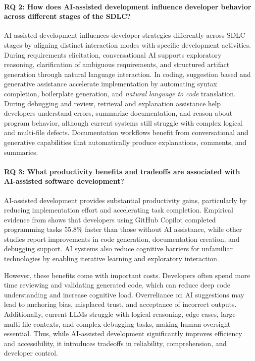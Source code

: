\paragraph{RQ 2: How does AI-assisted development influence developer behavior across different stages of the SDLC?}
AI-assisted development influences developer strategies differently across SDLC stages by aligning distinct interaction modes with specific development activities. During requirements elicitation, conversational AI supports exploratory reasoning, clarification of ambiguous requirements, and structured artifact generation through natural language interaction. In coding, suggestion based and generative assistance accelerate implementation by automating syntax completion, boilerplate generation, and \textit{natural language to code} translation. During debugging and review, retrieval and explanation assistance help developers understand errors, summarize documentation, and reason about program behavior, although current systems still struggle with complex logical and multi-file defects. Documentation workflows benefit from conversational and generative capabilities that automatically produce explanations, comments, and summaries.


\paragraph{RQ 3: What productivity benefits and tradeoffs are associated with AI-assisted software development?}
AI-assisted development provides substantial productivity gains, particularly by reducing implementation effort and accelerating task completion. Empirical evidence from \citet{peng2023copilot} shows that developers using GitHub Copilot completed programming tasks 55.8\% faster than those without AI assistance, while other studies report improvements in code generation, documentation creation, and debugging support. AI systems also reduce cognitive barriers for unfamiliar technologies by enabling iterative learning and exploratory interaction.

However, these benefits come with important costs. Developers often spend more time reviewing and validating generated code, which can reduce deep code understanding and increase cognitive load. Overreliance on AI suggestions may lead to anchoring bias, misplaced trust, and acceptance of incorrect outputs. Additionally, current LLMs struggle with logical reasoning, edge cases, large multi-file contexts, and complex debugging tasks, making human oversight essential. Thus, while AI-assisted development significantly improves efficiency and accessibility, it introduces tradeoffs in reliability, comprehension, and developer control.